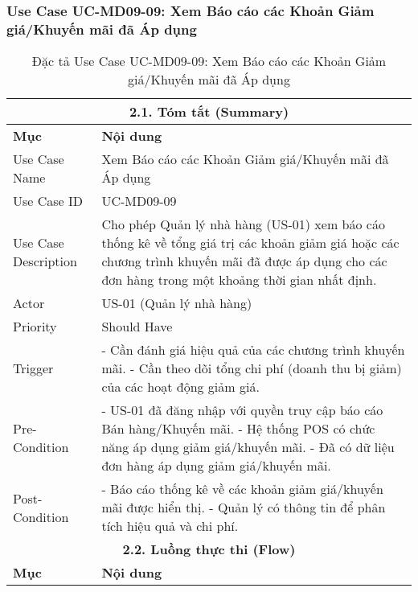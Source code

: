 \subsubsection{Use Case UC-MD09-09: Xem Báo cáo các Khoản Giảm giá/Khuyến mãi đã Áp dụng}
\begin{longtable}{|m{4cm}|p{11cm}|}
\caption{Đặc tả Use Case UC-MD09-09: Xem Báo cáo các Khoản Giảm giá/Khuyến mãi đã Áp dụng} \label{tab:uc_md09_09_corrected} \\
\hline
\multicolumn{2}{|c|}{\textbf{2.1. Tóm tắt (Summary)}} \\
\hline
\textbf{Mục} & \textbf{Nội dung} \\
\hline
\endhead %
\midrule
\endfoot %
\bottomrule
\endlastfoot %
Use Case Name & Xem Báo cáo các Khoản Giảm giá/Khuyến mãi đã Áp dụng \\
\hline
Use Case ID & UC-MD09-09 \\
\hline
Use Case Description & Cho phép Quản lý nhà hàng (US-01) xem báo cáo thống kê về tổng giá trị các khoản giảm giá hoặc các chương trình khuyến mãi đã được áp dụng cho các đơn hàng trong một khoảng thời gian nhất định. \\
\hline
Actor & US-01 (Quản lý nhà hàng) \\
\hline
Priority & Should Have \\
\hline
Trigger & - Cần đánh giá hiệu quả của các chương trình khuyến mãi. \newline - Cần theo dõi tổng chi phí (doanh thu bị giảm) của các hoạt động giảm giá. \\
\hline
Pre-Condition & - US-01 đã đăng nhập với quyền truy cập báo cáo Bán hàng/Khuyến mãi. \newline - Hệ thống POS có chức năng áp dụng giảm giá/khuyến mãi. \newline - Đã có dữ liệu đơn hàng áp dụng giảm giá/khuyến mãi. \\
\hline
Post-Condition & - Báo cáo thống kê về các khoản giảm giá/khuyến mãi được hiển thị. \newline - Quản lý có thông tin để phân tích hiệu quả và chi phí. \\
\hline
\multicolumn{2}{|c|}{\textbf{2.2. Luồng thực thi (Flow)}} \\
\hline
\textbf{Mục} & \textbf{Nội dung} \\
\hline

\end{longtable}
